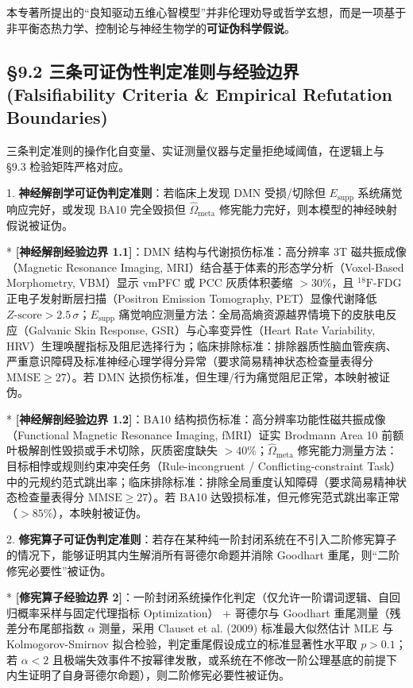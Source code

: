 \documentclass[11pt,a4paper,oneside]{ctexart}
\begin{document}
本专著所提出的“良知驱动五维心智模型”并非伦理劝导或哲学玄想，而是一项基于非平衡态热力学、控制论与神经生物学的\textbf{可证伪科学假说}。


\subsection{§9.2 三条可证伪性判定准则与经验边界 (Falsifiability Criteria \& Empirical Refutation Boundaries)}

三条判定准则的操作化自变量、实证测量仪器与定量拒绝域阈值，在逻辑上与 §9.3 检验矩阵严格对应。




\begin{cautionbox}
1. \textbf{神经解剖学可证伪判定准则}：若临床上发现 DMN 受损/切除但 $E_{\text{supp}}$ 系统痛觉响应完好，或发现 BA10 完全毁损但 $\hat{\Omega}_{\text{meta}}$ 修宪能力完好，则本模型的神经映射假说被证伪。

* \textbf{[神经解剖经验边界 1.1]}：DMN 结构与代谢损伤标准：高分辨率 3T 磁共振成像（Magnetic Resonance Imaging, MRI）结合基于体素的形态学分析（Voxel-Based Morphometry, VBM）显示 vmPFC 或 PCC 灰质体积萎缩 $>30\%$，且 $^{18}\text{F-FDG}$ 正电子发射断层扫描（Positron Emission Tomography, PET）显像代谢降低 $Z\text{-score} > 2.5\,\sigma$；$E_{\text{supp}}$ 痛觉响应测量方法：全局高熵资源越界情境下的皮肤电反应（Galvanic Skin Response, GSR）与心率变异性（Heart Rate Variability, HRV）生理唤醒指标及阻尼选择行为；临床排除标准：排除器质性脑血管疾病、严重意识障碍及标准神经心理学得分异常（要求简易精神状态检查量表得分 $\text{MMSE} \ge 27$）。若 DMN 达损伤标准，但生理/行为痛觉阻尼正常，本映射被证伪。

* \textbf{[神经解剖经验边界 1.2]}：BA10 结构损伤标准：高分辨率功能性磁共振成像（Functional Magnetic Resonance Imaging, fMRI）证实 Brodmann Area 10 前额叶极解剖性毁损或手术切除，灰质密度缺失 $>40\%$；$\hat{\Omega}_{\text{meta}}$ 修宪能力测量方法：目标相悖或规则约束冲突任务（Rule-incongruent / Conflicting-constraint Task）中的元规约范式跳出率；临床排除标准：排除全局重度认知障碍（要求简易精神状态检查量表得分 $\text{MMSE} \ge 27$）。若 BA10 达毁损标准，但元修宪范式跳出率正常（$>85\%$），本映射被证伪。

2. \textbf{修宪算子可证伪判定准则}：若存在某种纯一阶封闭系统在不引入二阶修宪算子的情况下，能够证明其内生解消所有哥德尔命题并消除 Goodhart 重尾，则“二阶修宪必要性”被证伪。

* \textbf{[修宪算子经验边界 2]}：一阶封闭系统操作化判定（仅允许一阶谓词逻辑、自回归概率采样与固定代理指标 Optimization） + 哥德尔与 Goodhart 重尾测量（残差分布尾部指数 $\alpha$ 测量，采用 Clauset et al. (2009) 标准最大似然估计 MLE 与 Kolmogorov-Smirnov 拟合检验，判定重尾假设成立的标准显著性水平取 $p > 0.1$；若 $\alpha < 2$ 且极端失效事件不按幂律发散，或系统在不修改一阶公理基底的前提下内生证明了自身哥德尔命题），则二阶修宪必要性被证伪。


\end{cautionbox}
\end{document}
